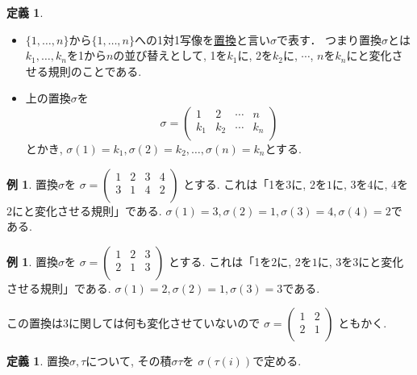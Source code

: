 \documentclass[dvipdfmx,a4paper,11pt]{article}
\theoremstyle{definition}
\newtheorem{dfn}[thm]{定義}
\newtheorem{exa}[thm]{例}
\begin{document}
\begin{tcolorbox}[
    colback = white,
    colframe = green!35!black,
    fonttitle = \bfseries,
    breakable = true]
    \begin{dfn}
    \text{}
    \begin{itemize}
\item $\{ 1, \ldots, n\}$から$\{ 1, \ldots, n\}$への1対1写像を\underline{置換}と言い$\sigma$で表す．
つまり置換$\sigma$とは$k_1, \ldots, k_n$を1から$n$の並び替えとして, 
1を$k_1$に, 2を$k_2$に, $\cdots$, $n$を$k_n$にと変化させる規則のことである.
\item 上の置換$\sigma$を
$$
\sigma =
  \begin{pmatrix}
 1& 2  &\cdots &n\\
 k_1& k_2  &\cdots &k_n\\
 \end{pmatrix} 
$$
とかき, $\sigma(1) =k_1, \sigma(2) =k_2, \ldots, \sigma(n) =k_n$とする.
    \end{itemize}
  \end{dfn}
 \end{tcolorbox}
 
 \begin{exa}
 置換$\sigma$を
$
\sigma =
  \begin{pmatrix}
 1& 2  &3 &4\\
 3& 1  &4 &2\\
 \end{pmatrix} 
$
とする. 
これは「1を$3$に, 2を$1$に, 3を4に, 4を$2$にと変化させる規則」である.
 $\sigma(1) =3, \sigma(2) =1, \sigma(3) =4,  \sigma(4) =2$である.
 \end{exa}
 
 \begin{exa}
 置換$\sigma$を
$
\sigma =
  \begin{pmatrix}
 1& 2  &3 \\
 2& 1  &3 \\
 \end{pmatrix} 
$
とする. 
これは「1を$2$に, 2を$1$に, 3を3にと変化させる規則」である.
 $\sigma(1) =2, \sigma(2) =1, \sigma(3) =3$である.
 
 この置換は3に関しては何も変化させていないので
 $
\sigma =
  \begin{pmatrix}
 1& 2   \\
 2& 1   \\
 \end{pmatrix} 
$
ともかく.
 \end{exa}

\begin{tcolorbox}[
    colback = white,
    colframe = green!35!black,
    fonttitle = \bfseries,
    breakable = true]
    \begin{dfn}
置換$\sigma, \tau$について, その積$\sigma \tau$を
$\sigma(\tau(i))$で定める.
  \end{dfn}
 \end{tcolorbox}
 
\end{document}
